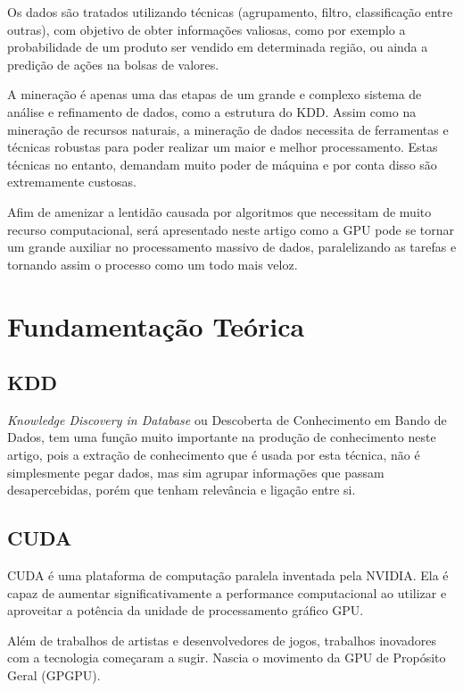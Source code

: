 \documentclass[conference]{IEEEtran}
\begin{document}
	Os dados s\~ao tratados  utilizando t\'ecnicas (agrupamento, filtro, classifica\c{c}\~ao entre outras), com objetivo de obter informa\c{c}\~oes valiosas, como por exemplo a probabilidade de um produto ser vendido em determinada regi\~ao, ou ainda a predi\c{c}\~ao de a\c{c}\~oes na bolsas de valores.
	
	A minera\c{c}\~ao \'e apenas uma das etapas de um grande e complexo sistema de an\'alise e refinamento de dados, como a estrutura do KDD.
	Assim como na minera\c{c}\~ao de recursos naturais, a minera\c{c}\~ao de dados necessita de ferramentas e t\'ecnicas robustas para poder realizar um maior e melhor processamento. Estas técnicas no entanto, demandam muito poder de máquina e por conta disso são extremamente custosas.
	
	Afim de amenizar a lentidão causada por algoritmos que necessitam de muito recurso computacional, será apresentado neste artigo como a GPU pode se tornar um grande auxiliar no processamento massivo de dados, paralelizando as tarefas e tornando assim o processo como um todo mais veloz.
	
	
	\section{Fundamenta\c{c}\~ao Te\'orica}
	
	\subsection{KDD}
	\textit{Knowledge Discovery in Database} ou Descoberta de Conhecimento em Bando de Dados, tem uma função muito importante na produção de conhecimento neste artigo, pois a extração de conhecimento que é usada por esta técnica, não é simplesmente pegar dados, mas sim agrupar informações que passam desapercebidas, porém que tenham relevância e ligação entre si.
	
	\subsection{CUDA}
	CUDA \'e uma plataforma de computa\c{c}\~ao paralela inventada pela NVIDIA. Ela \'e capaz de aumentar significativamente a performance computacional ao utilizar e aproveitar a pot\^encia da unidade de processamento gr\'afico GPU.
	
	Al\'em de trabalhos de artistas e desenvolvedores de jogos, trabalhos inovadores com a tecnologia come\c{c}aram a sugir. Nascia o movimento da GPU de Prop\'osito Geral 
	(GPGPU).
	
\end{document}
